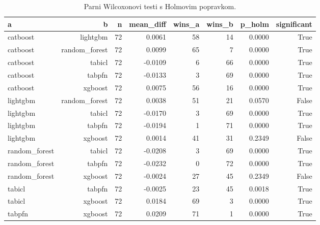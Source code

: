 \begin{table}[htbp]
\centering
\caption{Parni Wilcoxonovi testi s Holmovim popravkom.}
\label{tab:wilcoxon}
\begin{tabular}{lrrrrrrr}
\hline
a & b & n & mean\_diff & wins\_a & wins\_b & p\_holm & significant \\
\hline
catboost & lightgbm & 72 & 0.0061 & 58 & 14 & 0.0000 & True \\
catboost & random\_forest & 72 & 0.0099 & 65 & 7 & 0.0000 & True \\
catboost & tabicl & 72 & -0.0109 & 6 & 66 & 0.0000 & True \\
catboost & tabpfn & 72 & -0.0133 & 3 & 69 & 0.0000 & True \\
catboost & xgboost & 72 & 0.0075 & 56 & 16 & 0.0000 & True \\
lightgbm & random\_forest & 72 & 0.0038 & 51 & 21 & 0.0570 & False \\
lightgbm & tabicl & 72 & -0.0170 & 3 & 69 & 0.0000 & True \\
lightgbm & tabpfn & 72 & -0.0194 & 1 & 71 & 0.0000 & True \\
lightgbm & xgboost & 72 & 0.0014 & 41 & 31 & 0.2349 & False \\
random\_forest & tabicl & 72 & -0.0208 & 3 & 69 & 0.0000 & True \\
random\_forest & tabpfn & 72 & -0.0232 & 0 & 72 & 0.0000 & True \\
random\_forest & xgboost & 72 & -0.0024 & 27 & 45 & 0.2349 & False \\
tabicl & tabpfn & 72 & -0.0025 & 23 & 45 & 0.0018 & True \\
tabicl & xgboost & 72 & 0.0184 & 69 & 3 & 0.0000 & True \\
tabpfn & xgboost & 72 & 0.0209 & 71 & 1 & 0.0000 & True \\
\hline
\end{tabular}
\end{table}
